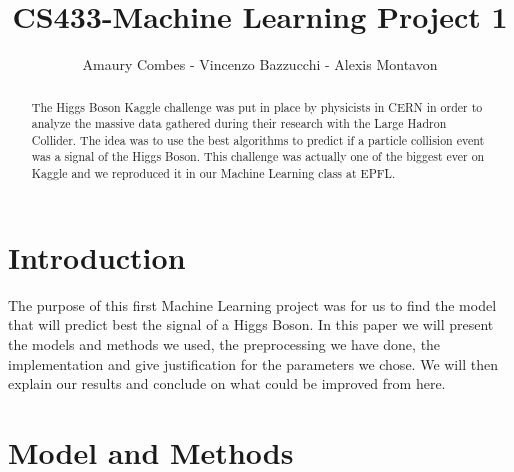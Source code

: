 \documentclass[10pt,conference,compsocconf]{IEEEtran}
\begin{document}
\title{CS433-Machine Learning Project 1}

\author{
  Amaury Combes - Vincenzo Bazzucchi - Alexis Montavon\\
}

\maketitle

\begin{abstract}
  The Higgs Boson Kaggle challenge was put in place by physicists in CERN in order to analyze the massive data gathered during their research with the Large Hadron Collider. The idea was to use the best algorithms to predict if a particle collision event was a signal of the Higgs Boson. This challenge was actually one of the biggest ever on Kaggle and we reproduced it in our Machine Learning class at EPFL.
\end{abstract}

\section{Introduction}

The purpose of this first Machine Learning project was for us to find the model that will predict best the signal of a Higgs Boson. In this paper we will present the models and methods we used, the preprocessing we have done, the implementation and give justification for the parameters we chose. We will then explain our results and conclude on what could be improved from here.

\section{Model and Methods}
\label{sec:model}
\end{document}
